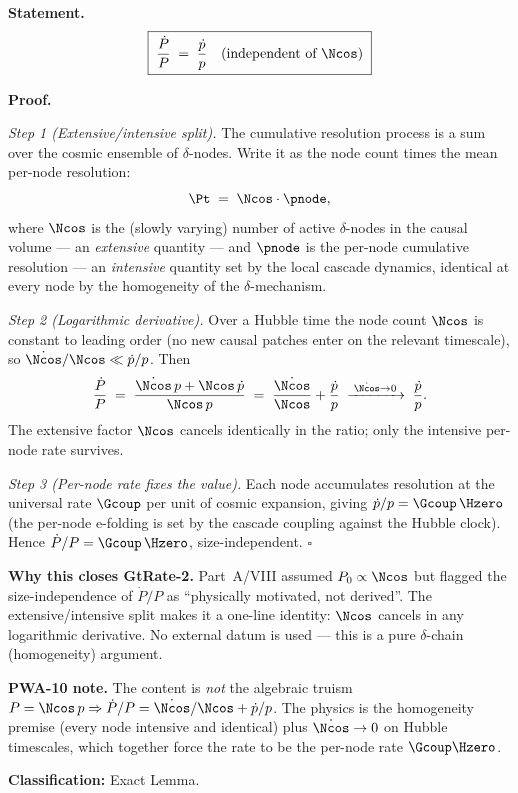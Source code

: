 \documentclass[12pt, a4paper]{article}
\begin{document}

\begin{formalbox}[title={LEM-ZC76-01: The Cosmic Rate Is Intensive
  ($R_0{\to}R_{\max}$, Exact)}]

\textbf{Statement.}
\begin{equation}
  \boxed{\;\frac{\dot{P}}{P} \;=\; \frac{\dot{p}}{p}
  \quad\text{(independent of }\Ncos\text{)}\;}
  \label{eq:intensive}
\end{equation}

\textbf{Proof.}

\textit{Step 1 (Extensive/intensive split).}
The cumulative resolution process is a sum over the cosmic ensemble of
$\delta$-nodes. Write it as the node count times the mean per-node
resolution:
\[
  \Pt \;=\; \Ncos\cdot\pnode,
\]
where $\Ncos$ is the (slowly varying) number of active $\delta$-nodes
in the causal volume --- an \emph{extensive} quantity --- and $\pnode$
is the per-node cumulative resolution --- an \emph{intensive} quantity
set by the local cascade dynamics, identical at every node by the
homogeneity of the $\delta$-mechanism.

\textit{Step 2 (Logarithmic derivative).}
Over a Hubble time the node count $\Ncos$ is constant to leading order
(no new causal patches enter on the relevant timescale), so
$\dot{\Ncos}/\Ncos \ll \dot{p}/p$. Then
\[
  \frac{\dot{P}}{P}
  \;=\; \frac{\dot{\Ncos}\,p + \Ncos\,\dot{p}}{\Ncos\,p}
  \;=\; \frac{\dot{\Ncos}}{\Ncos} + \frac{\dot{p}}{p}
  \;\xrightarrow{\;\dot{\Ncos}\to 0\;}\;
  \frac{\dot{p}}{p}.
\]
The extensive factor $\Ncos$ cancels identically in the ratio; only the
intensive per-node rate survives.

\textit{Step 3 (Per-node rate fixes the value).}
Each node accumulates resolution at the universal rate $\Gcoup$ per unit
of cosmic expansion, giving $\dot{p}/p = \Gcoup\,\Hzero$ (the per-node
e-folding is set by the cascade coupling against the Hubble clock).
Hence $\dot{P}/P = \Gcoup\,\Hzero$, size-independent.
\hfill$\square$

\textbf{Why this closes GtRate-2.}
Part~A/VIII assumed $P_0 \propto \Ncos$ but flagged the
size-independence of $\dot{P}/P$ as ``physically motivated, not
derived''. The extensive/intensive split makes it a one-line identity:
$\Ncos$ cancels in any logarithmic derivative. No external datum is
used --- this is a pure $\delta$-chain (homogeneity) argument.

\textbf{PWA-10 note.}
The content is \emph{not} the algebraic truism $P = \Ncos\,p \Rightarrow
\dot{P}/P = \dot{\Ncos}/\Ncos + \dot{p}/p$. The physics is the
homogeneity premise (every node intensive and identical) plus
$\dot{\Ncos}\to 0$ on Hubble timescales, which together force the rate
to be the per-node rate $\Gcoup\Hzero$.

\textbf{Classification:} Exact Lemma.
\end{formalbox}
\end{document}
